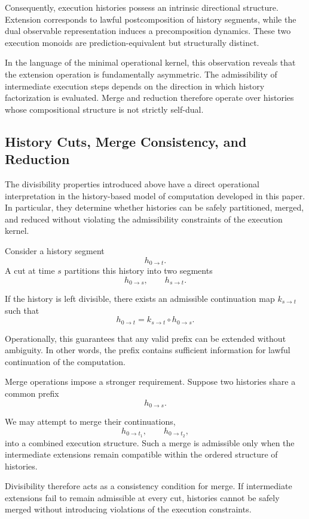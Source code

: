 \documentclass[12pt]{article}
\begin{document}
Consequently, execution histories possess an intrinsic directional
structure. Extension corresponds to lawful postcomposition of
history segments, while the dual observable representation induces
a precomposition dynamics. These two execution monoids are
prediction-equivalent but structurally distinct.

In the language of the minimal operational kernel, this observation
reveals that the extension operation is fundamentally asymmetric.
The admissibility of intermediate execution steps depends on the
direction in which history factorization is evaluated. Merge and
reduction therefore operate over histories whose compositional
structure is not strictly self-dual.

\subsection{History Cuts, Merge Consistency, and Reduction}

The divisibility properties introduced above have a direct operational
interpretation in the history-based model of computation developed in
this paper. In particular, they determine whether histories can be
safely partitioned, merged, and reduced without violating the
admissibility constraints of the execution kernel.

Consider a history segment
\[
h_{0\to t}.
\]
A cut at time $s$ partitions this history into two segments
\[
h_{0\to s}, \qquad h_{s\to t}.
\]

If the history is left divisible, there exists an admissible
continuation map $k_{s\to t}$ such that
\[
h_{0\to t} = k_{s\to t} \circ h_{0\to s}.
\]

Operationally, this guarantees that any valid prefix can be extended
without ambiguity. In other words, the prefix contains sufficient
information for lawful continuation of the computation.

Merge operations impose a stronger requirement. Suppose two histories
share a common prefix
\[
h_{0\to s}.
\]

We may attempt to merge their continuations,
\[
h_{0\to t_1}, \qquad h_{0\to t_2},
\]
into a combined execution structure. Such a merge is admissible only
when the intermediate extensions remain compatible within the ordered
structure of histories.

Divisibility therefore acts as a consistency condition for merge.
If intermediate extensions fail to remain admissible at every cut,
histories cannot be safely merged without introducing violations of
the execution constraints.
\end{document}
